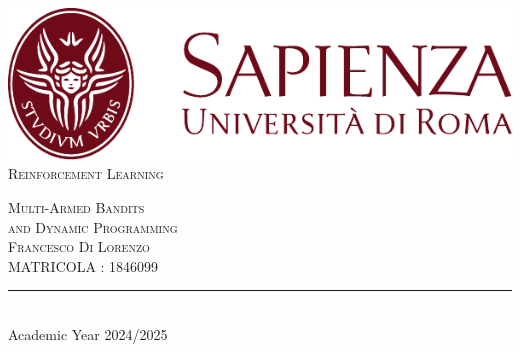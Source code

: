 \begin{titlepage}
	\centering
    \vspace*{0.5 cm}
    \includegraphics[scale = 0.75]{figures/SapienzaLogo.pdf}\\[1.0 cm]	%

    \vspace*{-0.4cm}
    \hspace{1cm}
    \textsc{\large Reinforcement Learning}\\[2.0 cm]	%
    \vspace*{1cm}

    { \fontsize{20.74pt}{18.5pt}\selectfont\bfseries \thetitle \par } %

    \vspace*{0.25cm}
    \textsc{\Large Multi-Armed Bandits \\ and Dynamic Programming}\\[0.5 cm] %

    \vspace*{10cm}
    \textsc{\Large Francesco Di Lorenzo}\\[0.1 cm] %
    \textsc{MATRICOLA : 1846099}

    \vspace{1cm}
    \rule{\linewidth}{0.2 mm} \\[0.3 cm]
    \vspace*{-0.2cm}
    Academic Year 2024/2025
\end{titlepage}